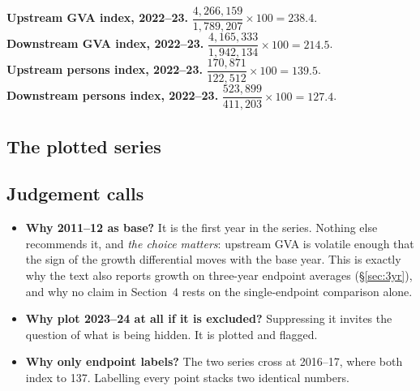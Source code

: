 \documentclass[11pt, a4paper]{article}
\begin{document}
\begin{work}
\textbf{Upstream GVA index, 2022--23.} $\dfrac{4{,}266{,}159}{1{,}789{,}207} \times 100
= 238.4$. \\[2pt]
\textbf{Downstream GVA index, 2022--23.} $\dfrac{4{,}165{,}333}{1{,}942{,}134} \times 100
= 214.5$. \\[2pt]
\textbf{Upstream persons index, 2022--23.} $\dfrac{170{,}871}{122{,}512} \times 100
= 139.5$. \\[2pt]
\textbf{Downstream persons index, 2022--23.} $\dfrac{523{,}899}{411{,}203} \times 100
= 127.4$.
\end{work}

\subsection{The plotted series}

\begin{table}[H]
\centering\footnotesize
{}
\end{table}

\subsection{Judgement calls}

\begin{itemize}[leftmargin=1.2em, itemsep=2pt]
\item \textbf{Why 2011--12 as base?} It is the first year in the series. Nothing else
recommends it, and \emph{the choice matters}: upstream GVA is volatile enough that
the sign of the growth differential moves with the base year. This is exactly why the
text also reports growth on three-year endpoint averages (§\ref{sec:3yr}), and why
no claim in Section~4 rests on the single-endpoint comparison alone.
\item \textbf{Why plot 2023--24 at all if it is excluded?} Suppressing it invites the
question of what is being hidden. It is plotted and flagged.
\item \textbf{Why only endpoint labels?} The two series cross at 2016--17, where both
index to 137. Labelling every point stacks two identical numbers.
\end{itemize}
\end{document}
